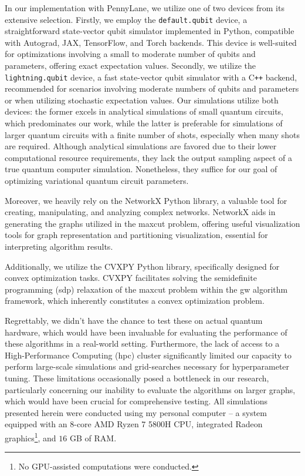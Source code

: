 In our implementation with PennyLane, we utilize one of two devices from its extensive selection. Firstly, we employ the \texttt{default.qubit} device, a straightforward state-vector qubit simulator implemented in Python, compatible with Autograd, JAX, TensorFlow, and Torch backends. This device is well-suited for optimizations involving a small to moderate number of qubits and parameters, offering exact expectation values. Secondly, we utilize the \texttt{lightning.qubit} device, a fast state-vector qubit simulator with a C\texttt{++} backend, recommended for scenarios involving moderate numbers of qubits and parameters or when utilizing stochastic expectation values. Our simulations utilize both devices: the former excels in analytical simulations of small quantum circuits, which predominates our work, while the latter is preferable for simulations of larger quantum circuits with a finite number of shots, especially when many shots are required. Although analytical simulations are favored due to their lower computational resource requirements, they lack the output sampling aspect of a true quantum computer simulation. Nonetheless, they suffice for our goal of optimizing variational quantum circuit parameters.

Moreover, we heavily rely on the NetworkX \cite{NetworkX} Python library, a valuable tool for creating, manipulating, and analyzing complex networks. NetworkX aids in generating the graphs utilized in the \acrshort{maxcut} problem, offering useful visualization tools for graph representation and partitioning visualization, essential for interpreting algorithm results.

Additionally, we utilize the CVXPY \cite{cvxpy} Python library, specifically designed for convex optimization tasks. CVXPY facilitates solving the semidefinite programming (\acrshort{sdp}) relaxation of the \acrshort{maxcut} problem within the \acrshort{gw} algorithm framework, which inherently constitutes a convex optimization problem.

Regrettably, we didn't have the chance to test these on actual quantum hardware, which would have been invaluable for evaluating the performance of these algorithms in a real-world setting. Furthermore, the lack of access to a High-Performance Computing (\acrshort{hpc}) cluster significantly limited our capacity to perform large-scale simulations and grid-searches necessary for hyperparameter tuning. These limitations occasionally posed a bottleneck in our research, particularly concerning our inability to evaluate the algorithms on larger graphs, which would have been crucial for comprehensive testing. All simulations presented herein were conducted using my personal computer – a system equipped with an 8-core AMD Ryzen 7 5800H CPU, integrated Radeon graphics\footnote{No GPU-assisted computations were conducted.}, and $16$ GB of RAM.

